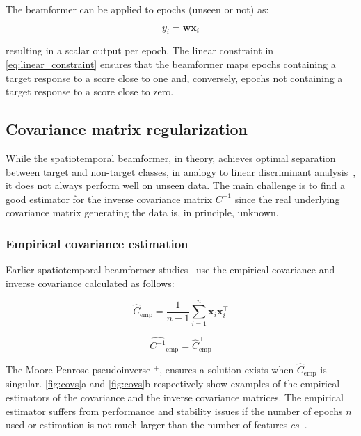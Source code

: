 The beamformer can be applied to epochs (unseen or not) as:

	\begin{equation}
		y_i = \mathbf{w}\mathbf{x}_i
		\label{eq:apply_beamformer}
	\end{equation}

resulting in a scalar output per epoch.
The linear constraint in \autoref{eq:linear_constraint} ensures that the
beamformer maps epochs containing a target response to a score close to one
and, conversely, epochs not containing a target response to a score close to
zero.

\subsection{Covariance matrix regularization}
While the spatiotemporal beamformer, in theory, achieves optimal separation
between target and non-target classes, in analogy to linear discriminant analysis~\cite{TREDER2016279}, it does not always perform well on unseen data.
The main challenge is to find a good estimator for the inverse covariance matrix $C^{-1}$ since the real underlying covariance matrix generating the data is, in principle, unknown.

\subsubsection{Empirical covariance estimation}
\label{sec:empirical_covariance}
Earlier spatiotemporal beamformer studies~\cite{Wittevrongel2016,
Wittevrongel2016a, Wittevrongel2017, Wittevrongel2017a} use the empirical
covariance and inverse covariance calculated as follows:

	\begin{equation}
		\hat{C}_\text{emp} =
		\frac{1}{n-1}\sum^{n}_{i=1}\mathbf{x}_i\mathbf{x}_i^\intercal
		\label{eq:empirical_covariance}
	\end{equation}


	\begin{equation}
		\widehat{C^{-1}}_\text{emp} = \hat{C}_\text{emp}^+
		\label{eq:empirical_inverse_covariance}
	\end{equation}

The Moore-Penrose pseudoinverse $^+$, ensures a solution exists when $\hat{C}_\text{emp}$ is singular.
\autoref{fig:covs}a and \autoref{fig:covs}b respectively show examples of the
empirical estimators of the covariance and the inverse covariance matrices.
The empirical estimator suffers from performance and
stability issues if the number of epochs $n$ used or estimation is not much larger than the number of features $cs$~\cite{Stein1956,Khatri1987}.

